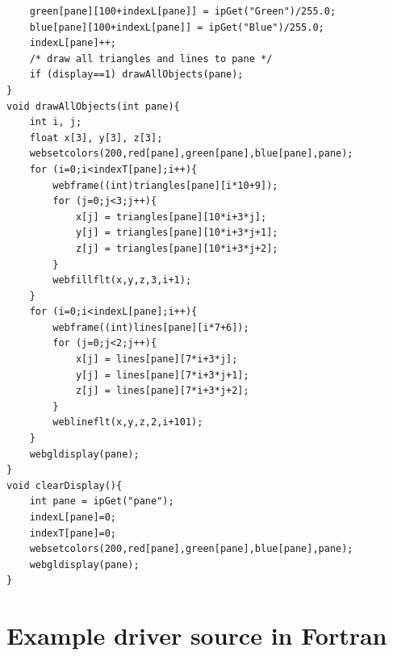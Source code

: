 \begin{verbatim}
    green[pane][100+indexL[pane]] = ipGet("Green")/255.0;
    blue[pane][100+indexL[pane]] = ipGet("Blue")/255.0;
    indexL[pane]++;
    /* draw all triangles and lines to pane */
    if (display==1) drawAllObjects(pane);
}
void drawAllObjects(int pane){
    int i, j;
    float x[3], y[3], z[3];
    websetcolors(200,red[pane],green[pane],blue[pane],pane);
    for (i=0;i<indexT[pane];i++){
        webframe((int)triangles[pane][i*10+9]);
        for (j=0;j<3;j++){
            x[j] = triangles[pane][10*i+3*j];
            y[j] = triangles[pane][10*i+3*j+1];
            z[j] = triangles[pane][10*i+3*j+2];
        }
        webfillflt(x,y,z,3,i+1);
    }
    for (i=0;i<indexL[pane];i++){
        webframe((int)lines[pane][i*7+6]);
        for (j=0;j<2;j++){
            x[j] = lines[pane][7*i+3*j];
            y[j] = lines[pane][7*i+3*j+1];
            z[j] = lines[pane][7*i+3*j+2];
        }
        weblineflt(x,y,z,2,i+101);
    }
    webgldisplay(pane);
}
void clearDisplay(){
    int pane = ipGet("pane");
    indexL[pane]=0;
    indexT[pane]=0;
    websetcolors(200,red[pane],green[pane],blue[pane],pane);
    webgldisplay(pane);
}
\end{verbatim}

\section{Example driver source in Fortran}



